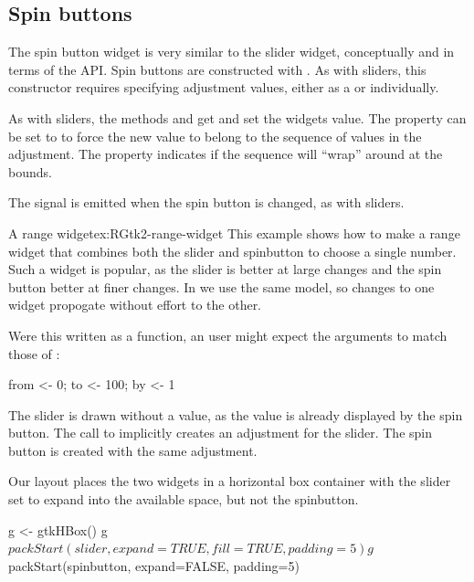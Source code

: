 \subsection{Spin buttons}
\label{sec:RGtk2:spinboxes}

The spin button widget is very similar to the slider widget,
conceptually and in terms of the \GTK\/ API. Spin buttons are
constructed with . As with sliders, this
constructor requires specifying adjustment values, either as a
 or individually. 

As with sliders, the methods  and
 get and set the widgets
value. The property  can be set to  to
force the new value to belong to the sequence of values in the
adjustment. The  property indicates if the sequence will
``wrap'' around at the bounds.

The  signal is emitted when the spin button is
changed, as with sliders.

\begin{example}{A range widget}{ex:RGtk2-range-widget}
This example shows how to make a range widget that combines both the
slider and spinbutton to choose a single number. Such a widget is
popular, as the slider is better at large changes and the spin button
better at finer changes. In \GTK\/ we use the same
 model, so changes to one widget propogate
without effort to the other.


Were this written as a function, an \R\/ user might expect the
arguments to match those of :
\begin{Schunk}
\begin{Sinput}
 from <- 0; to <- 100; by <- 1
\end{Sinput}
\end{Schunk}

The slider is drawn without a value, as the value is already displayed
by the spin button. The call to  implicitly
creates an adjustment for the slider. The spin button is created with
the same adjustment.
\begin{Schunk}
\end{Schunk}
%
Our layout places the two widgets in a horizontal box container with
the slider set to expand into the available space, but not the
spinbutton.
\begin{Schunk}
\begin{Sinput}
 g <- gtkHBox()
 g$packStart(slider, expand=TRUE, fill=TRUE, padding=5)
 g$packStart(spinbutton, expand=FALSE, padding=5)
\end{Sinput}
\end{Schunk}


\end{example}


